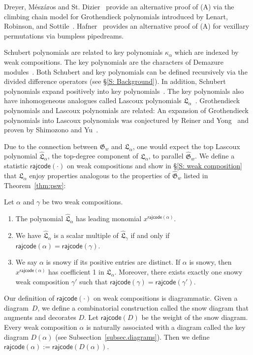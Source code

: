 \documentclass[ALCO]{cedram}
\newcommand{\fG}{\mathfrak{G}}
\newcommand{\fGb}{\fG}
\newcommand{\fL}{\mathfrak{L}}
\newcommand{\fLb}{\fL}
\newcommand{\topLas}{\widehat{\fL}}
\newcommand{\topGro}{\widehat{\fG}}
\newcommand{\rajcode}{\mathsf{rajcode}}
\begin{document}
Dreyer, M\'esz\'aros and St. Dizier~\cite{dms22}
provide an alternative proof of (A) via the 
climbing chain model for Grothendieck polynomials
introduced by Lenart, Robinson, and Sottile~\cite{LRS}.
Hafner~\cite{Haf} provides an alternative proof of (A)
for vexillary permutations via bumpless pipedreams.

Schubert polynomials are related
to key polynomials $\kappa_\alpha$
which are indexed by weak compositions.
The key polynomials are the characters of 
Demazure modules~\cite{De}.
Both Schubert and key polynomials 
can be defined recursively 
via the divided difference operators 
(see \S\ref{S: Background}).
In addition, Schubert polynomials
expand positively into key polynomials~\cite{RS}.
The key polynomials also have
inhomogeneous analogues called Lascoux polynomials $\fLb_\alpha$~\cite{Las}.
Grothendieck polynomials and Lascoux polynomials are related: 
An expansion of Grothendieck polynomials into Lascoux polynomials 
was conjectured by Reiner and Yong~\cite{RY} and 
proven by Shimozono and Yu~\cite{SY}.

Due to the connection between $\fGb_w$ and $\fLb_\alpha$, one would expect the top Lascoux polynomial $\topLas_\alpha$, the top-degree component of $\fLb_\alpha$, to parallel $\topGro_w$. 
We define a statistic $\rajcode(\cdot)$ on weak compositions and show in \S\ref{S: weak composition} that $\topLas_\alpha$ enjoy properties analogous to the properties of $\topGro_w$ listed in Theorem~\ref{thm:psw}:


\begin{ourthm}
\label{T: Top Las}
Let $\alpha$ and $\gamma$ be two weak compositions. 
\begin{enumerate}
\item[(a)]
The polynomial $\topLas_\alpha$ has leading monomial $x^{\rajcode(\alpha)}$.
\item[(b)] We have
$\topLas_\alpha$ is a scalar multiple of $\topLas_{\gamma}$
if and only if $\rajcode(\alpha) = \rajcode(\gamma)$.
\item[(c)] 
We say $\alpha$ is snowy if its
positive entries are distinct.
If $\alpha$ is snowy, then $x^{\rajcode(\alpha)}$ has coefficient 1 in $\topLas_\alpha$.
Moreover, 
there exists exactly one snowy weak composition $\gamma'$ 
such that $\rajcode(\gamma) = \rajcode(\gamma')$.
\end{enumerate}     
\end{ourthm}

Our definition of $\rajcode(\cdot)$
on weak compositions is diagrammatic. 
Given a diagram~$D$, 
we define a combinatorial
construction called the snow diagram 
that augments and decorates $D$.
Let $\rajcode(D)$
be the weight of the snow diagram.
Every weak composition $\alpha$ is naturally
associated with a diagram called
the key diagram $D(\alpha)$
(see Subsection~\ref{subsec.diagrams}).
Then we define $\rajcode(\alpha):=\rajcode(D(\alpha))$.
\end{document}
